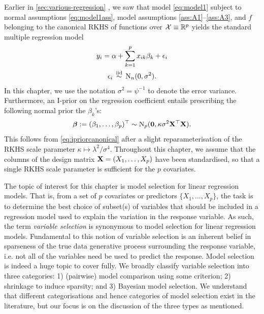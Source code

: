 \documentclass[11pt,twoside,openright]{report}
\begin{document}
\thispagestyle{chaptersix}

Earlier in \cref{sec:various-regression} , we saw that model \cref{eq:model1} subject to normal assumptions \cref{eq:model1ass}, model assumptions \ref{ass:A1}--\ref{ass:A3}, and $f$ belonging to the canonical RKHS of functions over ${\mathcal X} \equiv \mathbb{R}^p$ yields the standard multiple regression model
\begin{align}\label{eq:linmod}
  \begin{gathered}
    y_i = \alpha + \sum_{k=1}^p x_{ik}\beta_k + \epsilon_i \\
    \epsilon_i \,\overset{\text{iid}}{\sim}\, \operatorname{N}_n(0, \sigma^2).
  \end{gathered}  
\end{align}
In this chapter, we use the notation $\sigma^2 = \psi^{-1}$ to denote the error variance.
Furthermore, an I-prior on the regression coefficient entails prescribing the following normal prior the $\beta_k$'s:
\[
  {\bm\beta} := (\beta_1,\dots,\beta_p)^\top \sim \operatorname{N}_p ({\mathbf 0},  \kappa \sigma^2 \mathbf X^\top \mathbf X).
\]
This follows from \cref{eq:ipriorcanonical} after a slight reparameterisation of the RKHS scale parameter $\kappa \mapsto \lambda^2/\sigma^4$. 
Throughout this chapter, we assume that the columns of the design matrix ${\mathbf X} = (X_1,\dots,X_p)$ have been standardised, so that a single RKHS scale parameter is sufficient for the $p$ covariates.

The topic of interest for this chapter is model selection for linear regression models.
That is, from a set of $p$ covariates or predictors $\{X_1,\dots,X_p\}$, the task is to determine the best choice of subset(s) of variables that should be included in a regression model used to explain the variation in the response variable.
As such, the term \emph{variable selection} is synonymous to model selection for linear regression models.
Fundamental to this notion of variable selection is an inherent belief in sparseness of the true data generative process surrounding the response variable, i.e. not all of the variables need be used to predict the response.
Model selection is indeed a huge topic to cover fully.
We broadly classify variable selection into three categories: 1) (pairwise) model comparison using some criterion; 2) shrinkage to induce sparsity; and 3) Bayesian model selection.
We understand that different categorisations and hence categories of model selection exist in the literature, but our focus is on the discussion of the three types as mentioned.
\end{document}
